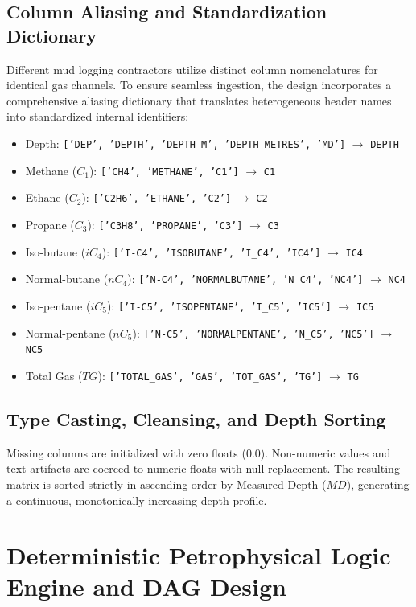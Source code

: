 \subsection{Column Aliasing and Standardization Dictionary}
Different mud logging contractors utilize distinct column nomenclatures for identical gas channels. To ensure seamless ingestion, the design incorporates a comprehensive aliasing dictionary that translates heterogeneous header names into standardized internal identifiers:
\begin{itemize}
    \item Depth: \texttt{['DEP', 'DEPTH', 'DEPTH\_M', 'DEPTH\_METRES', 'MD']} $\rightarrow$ \texttt{DEPTH}
    \item Methane ($C_1$): \texttt{['CH4', 'METHANE', 'C1']} $\rightarrow$ \texttt{C1}
    \item Ethane ($C_2$): \texttt{['C2H6', 'ETHANE', 'C2']} $\rightarrow$ \texttt{C2}
    \item Propane ($C_3$): \texttt{['C3H8', 'PROPANE', 'C3']} $\rightarrow$ \texttt{C3}
    \item Iso-butane ($iC_4$): \texttt{['I-C4', 'ISOBUTANE', 'I\_C4', 'IC4']} $\rightarrow$ \texttt{IC4}
    \item Normal-butane ($nC_4$): \texttt{['N-C4', 'NORMALBUTANE', 'N\_C4', 'NC4']} $\rightarrow$ \texttt{NC4}
    \item Iso-pentane ($iC_5$): \texttt{['I-C5', 'ISOPENTANE', 'I\_C5', 'IC5']} $\rightarrow$ \texttt{IC5}
    \item Normal-pentane ($nC_5$): \texttt{['N-C5', 'NORMALPENTANE', 'N\_C5', 'NC5']} $\rightarrow$ \texttt{NC5}
    \item Total Gas ($TG$): \texttt{['TOTAL\_GAS', 'GAS', 'TOT\_GAS', 'TG']} $\rightarrow$ \texttt{TG}
\end{itemize}

\subsection{Type Casting, Cleansing, and Depth Sorting}
Missing columns are initialized with zero floats ($0.0$). Non-numeric values and text artifacts are coerced to numeric floats with null replacement. The resulting matrix is sorted strictly in ascending order by Measured Depth ($MD$), generating a continuous, monotonically increasing depth profile.

\section{Deterministic Petrophysical Logic Engine and DAG Design}

